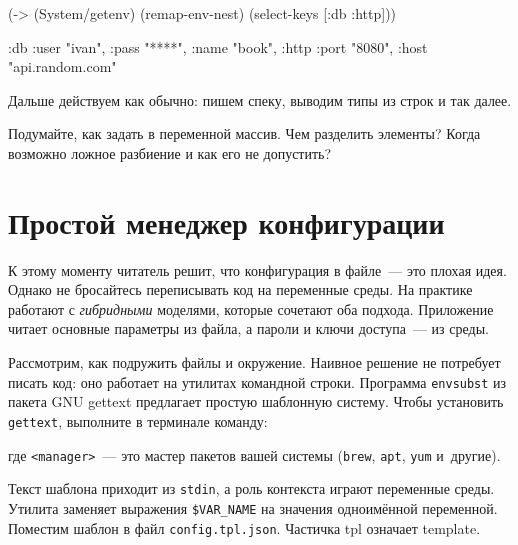 \else

\begin{english}
  \begin{clojure}
(-> (System/getenv)
    (remap-env-nest)
    (select-keys [:db :http]))

{:db {:user "ivan", :pass "****", :name "book"},
 :http {:port "8080", :host "api.random.com"}}
  \end{clojure}
\end{english}

\fi

\noindent
Дальше действуем как обычно: пишем спеку, выводим типы из строк и так далее.

Подумайте, как задать в переменной массив. Чем разделить элементы? Когда
возможно ложное разбиение и как его не допустить?

\section{Простой менеджер конфигурации}


К этому моменту читатель решит, что конфигурация в файле~--- это плохая идея. Однако
не бросайтесь переписывать код на переменные среды. На практике работают с
\emph{гибридными} моделями, которые сочетают оба подхода. Приложение читает
основные параметры из файла, а пароли и ключи доступа~--- из среды.


Рассмотрим, как подружить файлы и окружение. Наивное решение не потребует писать
код: оно работает на утилитах командной строки. Программа \verb|envsubst| из
пакета GNU gettext предлагает простую шаблонную систему. Чтобы установить
\verb|gettext|, выполните в терминале команду:


\begin{english}
\end{english}

\noindent
где \verb|<manager>|~--- это мастер пакетов вашей системы (\verb|brew|,
\verb|apt|, \verb|yum| и~другие).


Текст шаблона приходит из \verb|stdin|, а роль контекста играют переменные
среды. Утилита заменяет выражения \verb|$VAR_NAME| на значения одноимённой
переменной. Поместим шаблон в файл \verb|config.tpl.json|. Частичка tpl
означает template.

